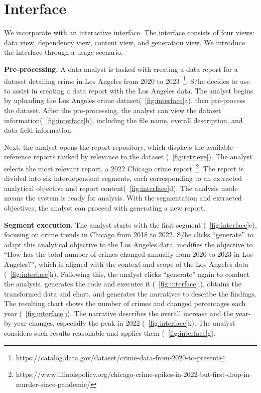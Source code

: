 \section{Interface}
\label{sec:usage_scenario}

We incorporate \system{} with an interactive interface. 
The interface consists of four views: data view, dependency view, content view, and generation view. 
We introduce the interface through a usage scenario. 

\textbf{Pre-processing. }
A data analyst is tasked with creating a data report for a dataset detailing crime in Los Angeles from 2020 to 2023~\footnote{https://catalog.data.gov/dataset/crime-data-from-2020-to-present}. 
S/he decides to use \system{} to assist in creating a data report with the Los Angeles data. 
The analyst begins by uploading the Los Angeles crime dataset(~\autoref{fig:interface}a). 
\system{} then pre-process the dataset. 
After the pre-processing, the analyst can view the dataset information(~\autoref{fig:interface}b), including the file name, overall description, and data field information. 

Next, the analyst opens the report repository, which displays the available reference reports ranked by relevance to the dataset (~\autoref{fig:retrieve}). 
The analyst selects the most relevant report, a 2022 Chicago crime report~\footnote{https://www.illinoispolicy.org/chicago-crime-spikes-in-2022-but-first-drop-in-murder-since-pandemic/}. 
The report is divided into six interdependent segments, each corresponding to an extracted analytical objective and report content(~\autoref{fig:interface}d). 
The analysis mode means the system is ready for analysis. 
With the segmentation and extracted objectives, the analyst can proceed with generating a new report.


\textbf{Segment execution. }
The analyst starts with the first segment (~\autoref{fig:interface}e), focusing on crime trends in Chicago from 2018 to 2022. 
S/he clicks ``generate'' to adapt this analytical objective to the Los Angeles data. 
\system{} modifies the objective to ``How has the total number of crimes changed annually from 2020 to 2023 in Los Angeles?'', which is aligned with the context and scope of the Los Angeles data (~\autoref{fig:interface}h). 
Following this, the analyst clicks ``generate'' again to conduct the analysis. 
\system{} generates the code and executes it (~\autoref{fig:interface}i), obtains the transformed data and chart, and generates the narratives to describe the findings. 
The resulting chart shows the number of crimes and changed percentages each year (~\autoref{fig:interface}j). 
The narrative describes the overall increase and the year-by-year changes, especially the peak in 2022 (~\autoref{fig:interface}k). 
The analyst considers such results reasonable and applies them (~\autoref{fig:interface}g). 


